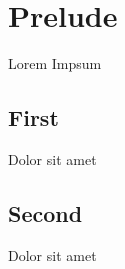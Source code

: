 \section{Prelude}
Lorem Impsum \cite{knuth-fa}
\subsection{First}
Dolor sit amet
\subsection{Second}
Dolor sit amet
